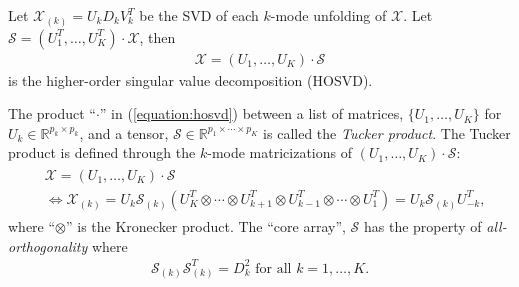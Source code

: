 \begin{definition}
  Let $\mathcal{X}_{(k)} = U_kD_kV_k^T$ be the SVD of each $k$-mode
  unfolding of $\mathcal{X}$. Let $\mathcal{S} =
  (U_1^T,\ldots,U_K^T)\cdot\mathcal{X}$, then
  \begin{align}
    \label{equation:hosvd}
    \mathcal{X} = (U_1,\ldots,U_K)\cdot \mathcal{S}
  \end{align}
  is the higher-order singular value decomposition (HOSVD).
\end{definition}
The product ``$\cdot$'' in (\ref{equation:hosvd}) between a list of
matrices, $\{U_1,\ldots,U_K\}$ for $U_k \in \mathbb{R}^{p_k \times
  p_k}$, and a tensor, $\mathcal{S} \in
\mathbb{R}^{p_1\times\cdots\times p_K}$ is called the \emph{Tucker
  product}. The Tucker product is defined through the $k$-mode
matricizations of $(U_1,\ldots,U_K)\cdot \mathcal{S}$:
\begin{align*}
  \begin{split}
    &\mathcal{X} = (U_1,\ldots,U_K)\cdot \mathcal{S}\\
    &\Leftrightarrow \mathcal{X}_{(k)} = U_k\mathcal{S}_{(k)}(U_K^T\otimes\cdots\otimes U_{k+1}^T\otimes U_{k-1}^T\otimes\cdots\otimes U_1^T) = U_k\mathcal{S}_{(k)}U_{-k}^T,
  \end{split}
\end{align*}
where ``$\otimes$'' is the Kronecker product.  The ``core array'',
$\mathcal{S}$ has the property of \emph{all-orthogonality} where
\begin{align*}
  \mathcal{S}_{(k)}\mathcal{S}_{(k)}^T = D_k^2 \text{ for all } k = 1,\ldots,K.
\end{align*}


